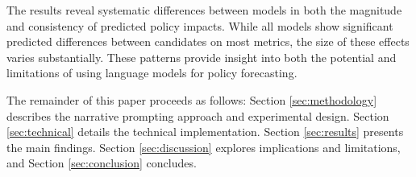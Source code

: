 The results reveal systematic differences between models in both the magnitude and consistency of predicted policy impacts. While all models show significant predicted differences between candidates on most metrics, the size of these effects varies substantially. These patterns provide insight into both the potential and limitations of using language models for policy forecasting.

The remainder of this paper proceeds as follows: Section \ref{sec:methodology} describes the narrative prompting approach and experimental design. Section \ref{sec:technical} details the technical implementation. Section \ref{sec:results} presents the main findings. Section \ref{sec:discussion} explores implications and limitations, and Section \ref{sec:conclusion} concludes.